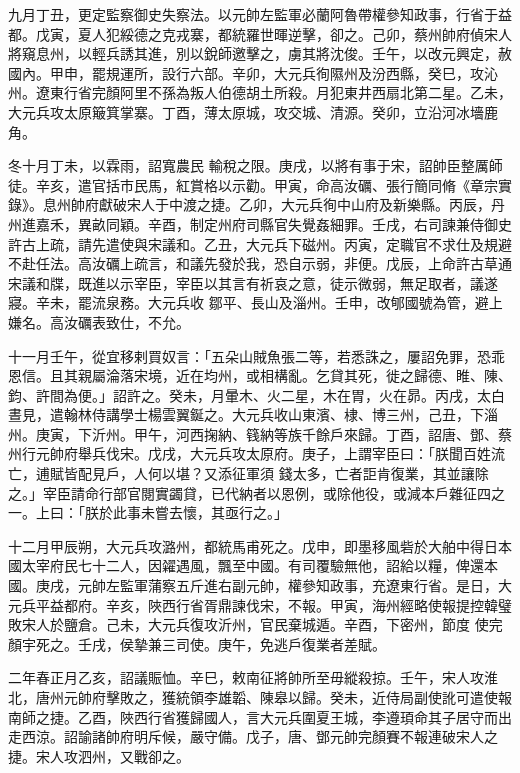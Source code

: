 \begin{pinyinscope}
 九月丁丑，更定監察御史失察法。以元帥左監軍必蘭阿魯帶權參知政事，行省于益都。戊寅，夏人犯綏德之克戎寨，都統羅世暉逆擊，卻之。己卯，蔡州帥府偵宋人將窺息州，以輕兵誘其進，別以銳師邀擊之，虜其將沈俊。壬午，以改元興定，赦國內。甲申，罷規運所，設行六部。辛卯，大元兵徇隰州及汾西縣，癸巳，攻沁州。遼東行省完顏阿里不孫為叛人伯德胡土所殺。月犯東井西扇北第二星。乙未，大元兵攻太原簸箕掌寨。丁酉，薄太原城，攻交城、清源。癸卯，立沿河冰墻鹿角。



 冬十月丁未，以霖雨，詔寬農民
 輸稅之限。庚戌，以將有事于宋，詔帥臣整厲師徒。辛亥，遣官括市民馬，紅賞格以示勸。甲寅，命高汝礪、張行簡同脩《章宗實錄》。息州帥府獻破宋人于中渡之捷。乙卯，大元兵徇中山府及新樂縣。丙辰，丹州進嘉禾，異畝同穎。辛酉，制定州府司縣官失覺姦細罪。壬戌，右司諫兼侍御史許古上疏，請先遣使與宋議和。乙丑，大元兵下磁州。丙寅，定職官不求仕及規避不赴任法。高汝礪上疏言，和議先發於我，恐自示弱，非便。戊辰，上命許古草通宋議和牒，既進以示宰臣，宰臣以其言有祈哀之意，徒示微弱，無足取者，議遂寢。辛未，罷流泉務。大元兵收
 鄒平、長山及淄州。壬申，改郇國號為管，避上嫌名。高汝礪表致仕，不允。



 十一月壬午，從宜移剌買奴言：「五朵山賊魚張二等，若悉誅之，屢詔免罪，恐乖恩信。且其親屬淪落宋境，近在均州，或相構亂。乞貸其死，徙之歸德、睢、陳、鈞、許間為便。」詔許之。癸未，月暈木、火二星，木在胃，火在昴。丙戌，太白晝見，遣翰林侍講學士楊雲翼鋋之。大元兵收山東濱、棣、博三州，己丑，下淄州。庚寅，下沂州。甲午，河西掬納、篯納等族千餘戶來歸。丁酉，詔唐、鄧、蔡州行元帥府舉兵伐宋。戊戌，大元兵攻太原府。庚子，上謂宰臣曰：「朕聞百姓流亡，逋賦皆配見戶，人何以堪？又添征軍須
 錢太多，亡者詎肯復業，其並讓除之。」宰臣請命行部官閱實蠲貸，已代納者以恩例，或除他役，或減本戶雜征四之一。上曰：「朕於此事未嘗去懷，其亟行之。」



 十二月甲辰朔，大元兵攻潞州，都統馬甫死之。戊申，即墨移風砦於大舶中得日本國太宰府民七十二人，因糴遇風，飄至中國。有司覆驗無他，詔給以糧，俾還本國。庚戌，元帥左監軍蒲察五斤進右副元帥，權參知政事，充遼東行省。是日，大元兵平益都府。辛亥，陜西行省胥鼎諫伐宋，不報。甲寅，海州經略使報提控韓璧敗宋人於鹽倉。己未，大元兵復攻沂州，官民棄城遁。辛酉，下密州，節度
 使完顏宇死之。壬戌，侯摯兼三司使。庚午，免逃戶復業者差賦。



 二年春正月乙亥，詔議賑恤。辛巳，敕南征將帥所至毋縱殺掠。壬午，宋人攻淮北，唐州元帥府擊敗之，獲統領李雄韜、陳皋以歸。癸未，近侍局副使訛可遣使報南師之捷。乙酉，陜西行省獲歸國人，言大元兵圍夏王城，李遵頊命其子居守而出走西涼。詔諭諸帥府明斥候，嚴守備。戊子，唐、鄧元帥完顏賽不報連破宋人之捷。宋人攻泗州，又戰卻之。




\end{pinyinscope}
